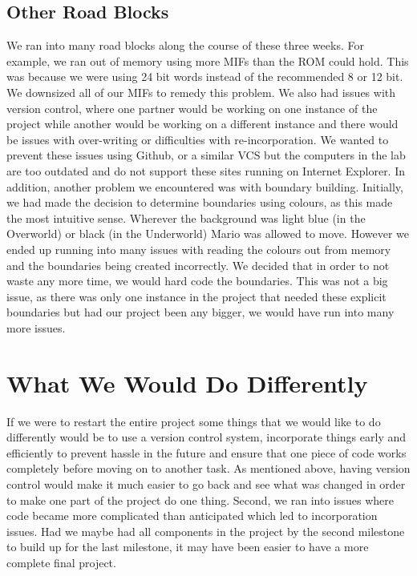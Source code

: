 \documentclass[12pt]{article}
\begin{document}
\subsection{Other Road Blocks}
We ran into many road blocks along the course of these three weeks. For example, we ran out of memory using more MIFs than the ROM could hold. This was because we were using 24 bit words instead of the recommended 8 or 12 bit. We downsized all of our MIFs to remedy this problem. We also had issues with version control, where one partner would be working on one instance of the project while another would be working on a different instance and there would be issues with over-writing or difficulties with re-incorporation. We wanted to prevent these issues using Github, or a similar VCS but the computers in the lab are too outdated and do not support these sites running on Internet Explorer. In addition, another problem we encountered was with boundary building. Initially, we had made the decision to determine boundaries using colours, as this made the most intuitive sense. Wherever the background was light blue (in the Overworld) or black (in the Underworld) Mario was allowed to move. However we ended up running into many issues with reading the colours out from memory and the boundaries being created incorrectly. We decided that in order to not waste any more time, we would hard code the boundaries. This was not a big issue, as there was only one instance in the project that needed these explicit boundaries but had our project been any bigger, we would have run into many more issues. 

\section{What We Would Do Differently}
If we were to restart the entire project some things that we would like to do differently would be to use a version control system, incorporate things early and efficiently to prevent hassle in the future and ensure that one piece of code works completely before moving on to another task. As mentioned above, having version control would make it much easier to go back and see what was changed in order to make one part of the project do one thing. Second, we ran into issues where code became more complicated than anticipated which led to incorporation issues. Had we maybe had all components in the project by the second milestone to build up for the last milestone, it may have been easier to have a more complete final project. 
\end{document}
